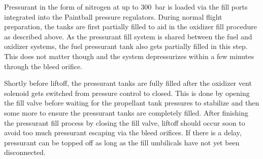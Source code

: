 Pressurant in the form of nitrogen at up to \SI{300}{\bar} is loaded via the fill ports integrated into the Paintball pressure regulators. During normal flight preparation, the tanks are first partially filled to aid in the oxidizer fill procedure as described above. As the pressurant fill system is shared between the fuel and oxidizer systems, the fuel pressurant tank also gets partially filled in this step. This does not matter though and the system depressurizes within a few minutes through the bleed orifice.

Shortly before liftoff, the pressurant tanks are fully filled after the oxidizer vent solenoid gets switched from pressure control to closed. This is done by opening the fill valve before waiting for the propellant tank pressures to stabilize and then some more to ensure the pressurant tanks are completely filled. After finishing the pressurant fill process by closing the fill valve, liftoff should occur soon to avoid too much pressurant escaping via the bleed orifices. If there is a delay, pressurant can be topped off as long as the fill umbilicals have not yet been disconnected.


